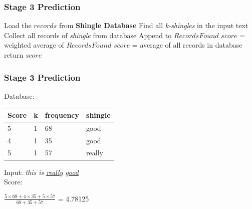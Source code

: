 \documentclass[11pt]{beamer}
\begin{document}
\begin{frame}
\frametitle{Stage 3 Prediction}

	\begin{tcolorbox}[
		colback=blue!5,
		colframe=blue!40!black,
		title=\textbf{Algorithm 3}: Prediction using length-k shingles]

		\begin{algorithm}[H]

			Load the \(records\) from \textbf{Shingle Database}\;
			Find all \textit{k-shingles} in the input text\;
			{
				Collect all records of \textit{shingle} from database\;
				Append to \(RecordsFound\)\;
			}
			{
				\(score\) = weighted average of \(RecordsFound\)\;
			}
			{
				\(score\) = average of all records in database\;
			}
			return \(score\)\;

		\end{algorithm}

	\end{tcolorbox}

\end{frame}


\begin{frame}
\frametitle{Stage 3 Prediction}

	\begin{tcolorbox}[
		colback=blue!5,
		colframe=blue!40!black!60,
		title=Prediction Example]

		Database:
		\begin{center}
			\begin{tabular}{llll}
			  \toprule
					Score & k & frequency & shingle \\
			  \midrule
					5 & 1 & 68 & good \\
					4 & 1 & 35 & good \\
					5 & 1 & 57 & really \\
			  \bottomrule
			\end{tabular}
		\end{center}

		Input: \textit{this is \underline{really} \underline{good}} \\
		Score:
		\begin{center}
			\(\frac{5 \times 68 + 4 \times 35 + 5 \times 57}{68 + 35 + 57}\) = 4.78125
		\end{center}

	\end{tcolorbox}
\end{frame}
\end{document}
